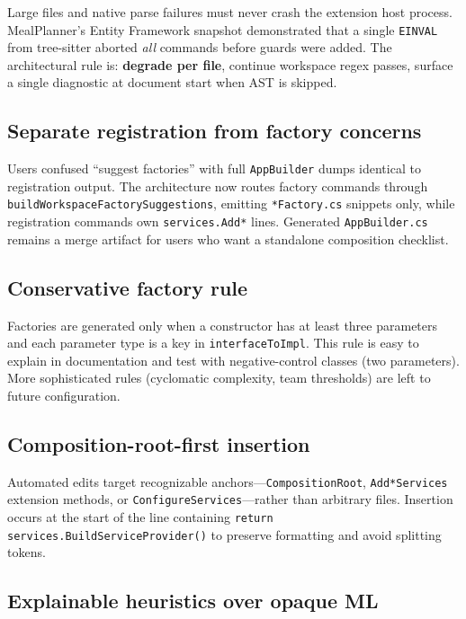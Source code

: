 Large files and native parse failures must never crash the extension host process. MealPlanner's Entity Framework snapshot demonstrated that a single \texttt{EINVAL} from tree-sitter aborted \emph{all} commands before guards were added. The architectural rule is: \textbf{degrade per file}, continue workspace regex passes, surface a single diagnostic at document start when AST is skipped.

\subsection{Separate registration from factory concerns}

Users confused ``suggest factories'' with full \texttt{AppBuilder} dumps identical to registration output. The architecture now routes factory commands through \texttt{buildWorkspaceFactorySuggestions}, emitting \texttt{*Factory.cs} snippets only, while registration commands own \texttt{services.Add*} lines. Generated \texttt{AppBuilder.cs} remains a merge artifact for users who want a standalone composition checklist.

\subsection{Conservative factory rule}

Factories are generated only when a constructor has at least three parameters and each parameter type is a key in \texttt{interfaceToImpl}. This rule is easy to explain in documentation and test with negative-control classes (two parameters). More sophisticated rules (cyclomatic complexity, team thresholds) are left to future configuration.

\subsection{Composition-root-first insertion}

Automated edits target recognizable anchors---\texttt{CompositionRoot}, \texttt{Add*Services} extension methods, or \texttt{ConfigureServices}---rather than arbitrary files. Insertion occurs at the start of the line containing \texttt{return services.BuildServiceProvider()} to preserve formatting and avoid splitting tokens.

\subsection{Explainable heuristics over opaque ML}

